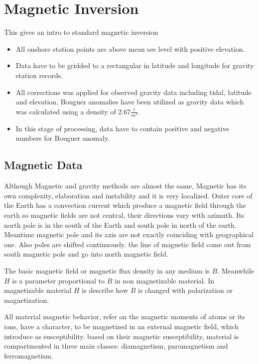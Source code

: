 \chapter{Magnetic Inversion}\label{Chp:cook:magnetic inversion}
This gives an intro to standard magnetic inversion


\begin{itemize}
\item All onshore station points are above mean see level with positive
elevation.

\item Data have to be gridded to a rectangular in latitude and longitude
for gravity station records.

\item All corrections was applied for observed gravity data including
tidal, latitude and elevation. Bouguer anomalies have been utilized as
gravity data which was calculated using a density of $2.67 \frac{t}{m^3}$.

\item In this stage of processing, data have to contain positive and
negative numbers for Bouguer anomaly.
\end{itemize}

\section{Magnetic Data} 

Although Magnetic and gravity methods are almost the same, Magnetic has its own complexity, elaboration and instability and it is very localized. Outer core of the Earth has a convection current which produce a magnetic field through the earth so magnetic fields are not central, their directions vary with azimuth. Its north pole is in the south of the Earth and south pole in north of the earth. Meantime magnetic pole and its axis are not exactly coinciding with geographical one. Also poles are shifted continuously. the line of magnetic field come out from south magnetic pole and go into north magnetic field. 

The basic magnetic field or magnetic flux density in any medium is $B$. Meanwhile $H$ is a parameter proportional to $B$ in non magnetizable material. In magnetizable material $H$ is describe how $B$ is changed with polarization or magnetization.

All material magnetic behavior, refer on the magnetic moments of atoms or its ions, have a character, to be magnetized in an external magnetic field, which introduce as susceptibility. based on their magnetic susceptibility, material is compartmented in three main classes: diamagnetism, paramagnetism and ferromagnetism.

